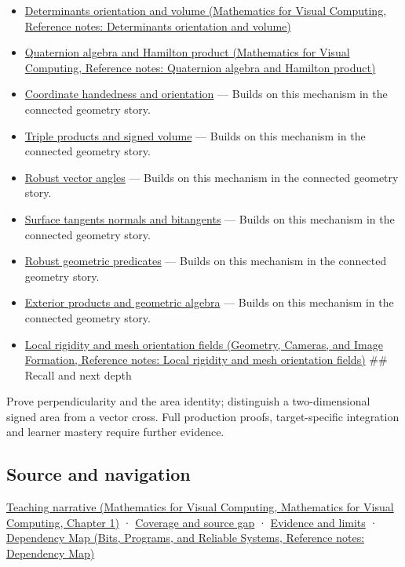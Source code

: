 \begin{itemize}
\item
  \href{../02-Mathematics-for-Visual-Computing/main.pdf\#nameddest=appendix-da478be01d02}{Determinants orientation and volume (Mathematics for Visual Computing, Reference notes: Determinants orientation and volume)}
\item
  \href{../02-Mathematics-for-Visual-Computing/main.pdf\#nameddest=appendix-965d9260eeab}{Quaternion algebra and Hamilton product (Mathematics for Visual Computing, Reference notes: Quaternion algebra and Hamilton product)}
\item
  \hyperref[appendix-87d7626c8d37]{Coordinate handedness and orientation} --- Builds on this mechanism in the connected geometry story.
\item
  \hyperref[appendix-5caa058bd9c7]{Triple products and signed volume} --- Builds on this mechanism in the connected geometry story.
\item
  \hyperref[appendix-e569e60e18e6]{Robust vector angles} --- Builds on this mechanism in the connected geometry story.
\item
  \hyperref[appendix-e31893dec985]{Surface tangents normals and bitangents} --- Builds on this mechanism in the connected geometry story.
\item
  \hyperref[appendix-341296fb3f64]{Robust geometric predicates} --- Builds on this mechanism in the connected geometry story.
\item
  \hyperref[appendix-e1960925d1b8]{Exterior products and geometric algebra} --- Builds on this mechanism in the connected geometry story.
\item
  \href{../03-Geometry-Cameras-and-Image-Formation/main.pdf\#nameddest=appendix-7107009c505b}{Local rigidity and mesh orientation fields (Geometry, Cameras, and Image Formation, Reference notes: Local rigidity and mesh orientation fields)} \#\# Recall and next depth
\end{itemize}

Prove perpendicularity and the area identity; distinguish a two-dimensional signed area from a vector cross. Full production proofs, target-specific integration and learner mastery require further evidence.

\subsection{Source and navigation}\label{appendix-2391db8052b1-source-and-navigation}

\href{../02-Mathematics-for-Visual-Computing/main.pdf\#nameddest=01-foundations-i-ch017-oriented-area-tells-us-which-side-of-the-panel-is-front}{Teaching narrative (Mathematics for Visual Computing, Mathematics for Visual Computing, Chapter 1)} · \hyperref[appendix-fd090d982a15-phase-6---parts-501-600]{Coverage and source gap} · \hyperref[appendix-a103e7846d21-phase-6---source-analysis-and-verification]{Evidence and limits} · \href{../01-Bits-Programs-and-Reliable-Systems/main.pdf\#nameddest=appendix-4ad47bdd269a}{Dependency Map (Bits, Programs, and Reliable Systems, Reference notes: Dependency Map)}
